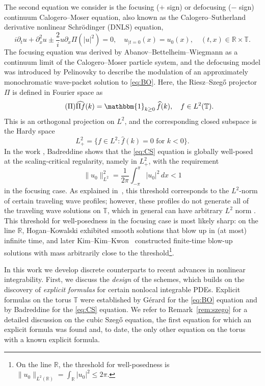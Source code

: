\documentclass [11pt] {article}
\newcommand{\be}{\begin{equation}}
\newcommand{\ee}{\end{equation}}
\newcommand{\<}{\langle}
\renewcommand{\>}{\rangle}
\newcommand{\wh}[1]{\widehat{#1}}
\begin{document}
The second equation we consider is the focusing ($+$ sign) or defocusing ($-$ sign) continuum Calogero--Moser equation, also known as the Calogero–Sutherland derivative nonlinear Schr\"odinger (DNLS) equation,
\begin{equation}\label{eq:CS}\tag{CCM}
i\partial_t u + \partial_x^2u \pm \frac{2}{i} u\partial_x \Pi(|u|^2) = 0,\quad  u_{|t=0}(x)= u_{0}(x), \quad (t,x) \in \mathbb{R} \times \mathbb{T}. 
\end{equation}%
\renewcommand*{\theHequation}{notag2.\theequation}%
The focusing equation was derived by Abanov--Bettelheim--Wiegmann \cite{abanov2009integrable} as a continuum limit of the Calogero--Moser particle system, and the defocusing model was introduced by Pelinovsky \cite{pelinovsky1995intermediate} to describe the modulation of an approximately monochromatic wave-packet solution to \eqref{eq:BO}.  Here, the Riesz--Szeg\H o projector $\Pi$ is defined in Fourier space as 
\be\label{eq:Pi}\tag{$\Pi$}
\widehat{\Pi f}(k) = \mathbbm{1}_{k\ge 0} \, \widehat{f}(k), \quad f\in L^2(\mathbb T).
\ee
\renewcommand*{\theHequation}{notag3.\theequation}%
This is an orthogonal projection on $L^2$, and the corresponding closed subspace is the Hardy space
\begin{equation}\label{eq:hardy}
L^2_+ = \{ f\in L^2 : \wh{f}(k) = 0 \text{ for }k<0 \} .
\end{equation}
In the work \cite{Badreddine24}, Badreddine shows that the \eqref{eq:CS} equation is globally well-posed at the scaling-critical regularity, namely in $L^2_{+}$, with the requirement
\[
\|u_0\|_{L^2}^2 = \frac{1}{2\pi} \int_{-\pi}^\pi |u_0|^2\, dx < 1
\]
in the focusing case.  As explained in~\cite{Badreddine24}, this threshold corresponds to the $L^2$-norm of certain traveling wave profiles; however, these profiles do not generate all of the traveling wave solutions on $\mathbb{T}$, which in general can have arbitrary $L^2$ norm \cite{Badreddine25}.  This threshold for well-posedness in the focusing case is most likely sharp:   on the line $\mathbb{R}$,  Hogan--Kowalski \cite{HK24} exhibited smooth solutions that blow up in (at most) infinite time, and later Kim--Kim--Kwon~\cite{Kim24} constructed finite-time blow-up solutions with mass arbitrarily close to the threshold\footnote{On the line $\mathbb{R}$, the threshold for well-posedness is $\| u_0\|_{L^2(\mathbb{R})} =  \int_{\mathbb{R}} |u_0|^2 \le 2\pi$.}.
\newline

In this work we develop discrete counterparts to recent advances in nonlinear integrability.
First, we discuss the {\it design} of the schemes, which builds on the discovery of {\it explicit formulas} for certain nonlocal integrable PDEs. 
Explicit formulas on the torus $\mathbb{T}$ were established by Gérard \cite{G} for the \eqref{eq:BO} equation and by Badreddine \cite{Badreddine24} for the \eqref{eq:CS} equation.
We refer to Remark~\ref{rem:szego} for a detailed discussion on the cubic Szeg\H{o} equation, the first equation for which an explicit formula was found \cite{gerard2015explicit} and, to date, the only other equation on the torus with a known explicit formula.
\end{document}
